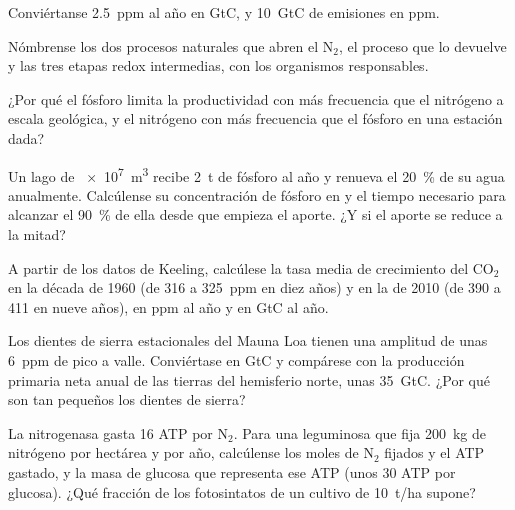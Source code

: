 \begin{exercise}[$\star$]\label{exo:b2:biogeochemical-cycles:2}
Conviértanse \qty{2.5}{ppm} al año en GtC, y \qty{10}{GtC} de emisiones
en ppm.
\end{exercise}

\begin{exercise}[$\star$]\label{exo:b2:biogeochemical-cycles:3}
Nómbrense los dos procesos naturales que abren el $\mathrm{N_2}$, el proceso
que lo devuelve y las tres etapas redox intermedias, con los organismos
responsables.
\end{exercise}

\begin{exercise}[$\star$]\label{exo:b2:biogeochemical-cycles:4}
¿Por qué el fósforo limita la productividad con más frecuencia que el
nitrógeno a escala geológica, y el nitrógeno con más frecuencia que el
fósforo en una estación dada?
\end{exercise}

\begin{exercise}[$\star\star$]\label{exo:b2:biogeochemical-cycles:5}
Un lago de \qty{e7}{m^3} recibe \qty{2}{t} de fósforo al año y renueva el
\qty{20}{\%} de su agua anualmente. Calcúlense su concentración de fósforo
en  y el tiempo necesario para alcanzar el \qty{90}{\%}
de ella desde que empieza el aporte. ¿Y si el aporte se reduce a la mitad?
\end{exercise}

\begin{exercise}[$\star\star$]\label{exo:b2:biogeochemical-cycles:6}
A partir de los datos de Keeling, calcúlese la tasa media de crecimiento
del $\mathrm{CO_2}$ en la década de 1960 (de 316 a \qty{325}{ppm} en diez años) y en
la de 2010 (de 390 a 411 en nueve años), en ppm al año y en GtC al año.
\end{exercise}

\begin{exercise}[$\star\star$]\label{exo:b2:biogeochemical-cycles:7}
Los dientes de sierra estacionales del Mauna Loa tienen una amplitud de
unas \qty{6}{ppm} de pico a valle. Conviértase en GtC y compárese con la
producción primaria neta anual de las tierras del hemisferio norte, unas
\qty{35}{GtC}. ¿Por qué son tan pequeños los dientes de sierra?
\end{exercise}

\begin{exercise}[$\star\star$]\label{exo:b2:biogeochemical-cycles:8}
La nitrogenasa gasta 16 ATP por $\mathrm{N_2}$. Para una leguminosa que fija
\qty{200}{kg} de nitrógeno por hectárea y por año, calcúlense los moles de
$\mathrm{N_2}$ fijados y el ATP gastado, y la masa de glucosa que representa
ese ATP (unos 30 ATP por glucosa). ¿Qué fracción de los fotosintatos de un
cultivo de \qty{10}{t/ha} supone?
\end{exercise}

